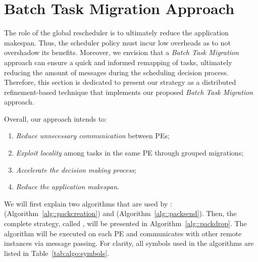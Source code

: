 \section{Batch Task Migration Approach} \label{sec:algo}



The role of the global rescheduler is to ultimately reduce the application makespan. 
Thus, the scheduler policy must incur low overheads as to not overshadow its benefits. 
Moreover, we envision that a \textit{Batch Task Migration} approach can ensure a quick and informed remapping of tasks, ultimately reducing the amount of messages during the scheduling decision process. 
Therefore, this section is dedicated to present our \packdrop strategy as a distributed refinement-based technique that implements our proposed \textit{Batch Task Migration} approach.

Overall, our approach intends to:

\begin{enumerate}
	\item \textit{Reduce unnecessary communication} between PEs;
	\item \textit{Exploit locality} among tasks in the same PE through grouped migrations;
	\item \textit{Accelerate the decision making process};
	\item \textit{Reduce the application makespan}.
\end{enumerate}

We will first explain two algorithms that are used by \packdrop: \batchassembly (Algorithm~\ref{alg::packcreation}) and \batchsend (Algorithm~\ref{alg::packsend}).
Then, the complete strategy, called \packdrop, will be presented in Algorithm~\ref{alg::packdrop}.
The \packdrop algorithm will be executed on each PE and communicates with other remote \packdrop instances via message passing.
For clarity, all symbols used in the algorithms are listed in Table~\ref{tab:algo:symbols}.

